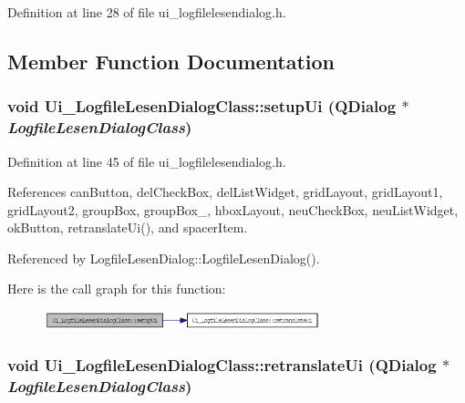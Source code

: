 Definition at line 28 of file ui\_\-logfilelesendialog.h.

\subsection{Member Function Documentation}
\hypertarget{class_ui___logfile_lesen_dialog_class_93c3bd2ec951df52fe5d2ebd7ad07dd1}{
\subsubsection[setupUi]{\setlength{\rightskip}{0pt plus 5cm}void Ui\_\-LogfileLesenDialogClass::setupUi (QDialog $\ast$ {\em LogfileLesenDialogClass})}}
\label{class_ui___logfile_lesen_dialog_class_93c3bd2ec951df52fe5d2ebd7ad07dd1}




Definition at line 45 of file ui\_\-logfilelesendialog.h.

References canButton, delCheckBox, delListWidget, gridLayout, gridLayout1, gridLayout2, groupBox, groupBox\_, hboxLayout, neuCheckBox, neuListWidget, okButton, retranslateUi(), and spacerItem.

Referenced by LogfileLesenDialog::LogfileLesenDialog().

Here is the call graph for this function:\nopagebreak
\begin{figure}[H]
\begin{center}
\leavevmode
\includegraphics[width=227pt]{class_ui___logfile_lesen_dialog_class_93c3bd2ec951df52fe5d2ebd7ad07dd1_cgraph}
\end{center}
\end{figure}
\hypertarget{class_ui___logfile_lesen_dialog_class_651e3ce2657266ca01523d7e73dfb1a2}{
\subsubsection[retranslateUi]{\setlength{\rightskip}{0pt plus 5cm}void Ui\_\-LogfileLesenDialogClass::retranslateUi (QDialog $\ast$ {\em LogfileLesenDialogClass})}}
\label{class_ui___logfile_lesen_dialog_class_651e3ce2657266ca01523d7e73dfb1a2}




